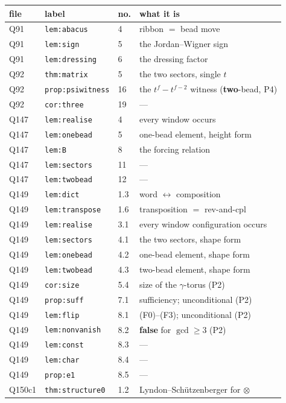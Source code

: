 \documentclass[11pt]{article}
\theoremstyle{definition}
\theoremstyle{remark}
\begin{document}
\medskip
\begin{longtable}{@{}llll@{}}
\hline
file & label & no. & what it is\\
\hline\endhead
Q91 & \texttt{lem:abacus} & 4 & ribbon $=$ bead move\\
Q91 & \texttt{lem:sign} & 5 & the Jordan--Wigner sign\\
Q91 & \texttt{lem:dressing} & 6 & the dressing factor\\
Q92 & \texttt{thm:matrix} & 5 & the two sectors, single $t$\\
Q92 & \texttt{prop:psiwitness} & 16 & the $t^{f}-t^{f-2}$ witness (\textbf{two}-bead, P4)\\
Q92 & \texttt{cor:three} & 19 & ---\\
Q147 & \texttt{lem:realise} & 4 & every window occurs\\
Q147 & \texttt{lem:onebead} & 5 & one-bead element, height form\\
Q147 & \texttt{lem:B} & 8 & the forcing relation\\
Q147 & \texttt{lem:sectors} & 11 & ---\\
Q147 & \texttt{lem:twobead} & 12 & ---\\
Q149 & \texttt{lem:dict} & 1.3 & word $\leftrightarrow$ composition\\
Q149 & \texttt{lem:transpose} & 1.6 & transposition $=$ rev-and-cpl\\
Q149 & \texttt{lem:realise} & 3.1 & every window configuration occurs\\
Q149 & \texttt{lem:sectors} & 4.1 & the two sectors, shape form\\
Q149 & \texttt{lem:onebead} & 4.2 & one-bead element, shape form\\
Q149 & \texttt{lem:twobead} & 4.3 & two-bead element, shape form\\
Q149 & \texttt{cor:size} & 5.4 & size of the $\gamma$-torus (P2)\\
Q149 & \texttt{prop:suff} & 7.1 & sufficiency; unconditional (P2)\\
Q149 & \texttt{lem:flip} & 8.1 & (F0)--(F3); unconditional (P2)\\
Q149 & \texttt{lem:nonvanish} & 8.2 & \textbf{false} for $\gcd\ge3$ (P2)\\
Q149 & \texttt{lem:const} & 8.3 & ---\\
Q149 & \texttt{lem:char} & 8.4 & ---\\
Q149 & \texttt{prop:e1} & 8.5 & ---\\
Q150c1 & \texttt{thm:structure0} & 1.2 & Lyndon--Sch\"utzenberger for $\otimes$\\

\end{longtable}
\end{document}

